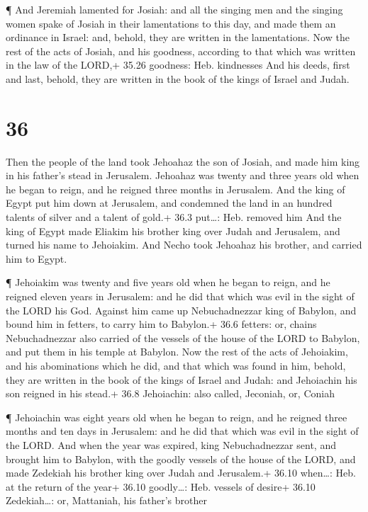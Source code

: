  ¶ And Jeremiah lamented for Josiah: and all the singing
men and the singing women spake of Josiah in their lamentations to this
day, and made them an ordinance in Israel: and, behold, they are written
in the lamentations.  Now the rest of the acts of Josiah,
and his goodness, according to that which was written in the law of the
LORD,+ 35.26 goodness: Heb. kindnesses  And his deeds,
first and last, behold, they are written in the book of the kings of
Israel and Judah.

\hypertarget{section-35}{%
\section{36}\label{section-35}}

 Then the people of the land took Jehoahaz the son of
Josiah, and made him king in his father's stead in Jerusalem.
 Jehoahaz was twenty and three years old when he began to
reign, and he reigned three months in Jerusalem.  And the
king of Egypt put him down at Jerusalem, and condemned the land in an
hundred talents of silver and a talent of gold.+ 36.3 put\ldots: Heb.
removed him  And the king of Egypt made Eliakim his brother
king over Judah and Jerusalem, and turned his name to Jehoiakim. And
Necho took Jehoahaz his brother, and carried him to Egypt.

 ¶ Jehoiakim was twenty and five years old when he began to
reign, and he reigned eleven years in Jerusalem: and he did that which
was evil in the sight of the LORD his God.  Against him came
up Nebuchadnezzar king of Babylon, and bound him in fetters, to carry
him to Babylon.+ 36.6 fetters: or, chains  Nebuchadnezzar
also carried of the vessels of the house of the LORD to Babylon, and put
them in his temple at Babylon.  Now the rest of the acts of
Jehoiakim, and his abominations which he did, and that which was found
in him, behold, they are written in the book of the kings of Israel and
Judah: and Jehoiachin his son reigned in his stead.+ 36.8 Jehoiachin:
also called, Jeconiah, or, Coniah

 ¶ Jehoiachin was eight years old when he began to reign,
and he reigned three months and ten days in Jerusalem: and he did that
which was evil in the sight of the LORD.  And when the year
was expired, king Nebuchadnezzar sent, and brought him to Babylon, with
the goodly vessels of the house of the LORD, and made Zedekiah his
brother king over Judah and Jerusalem.+ 36.10 when\ldots: Heb. at the
return of the year+ 36.10 goodly\ldots: Heb. vessels of desire+ 36.10
Zedekiah\ldots: or, Mattaniah, his father's brother

